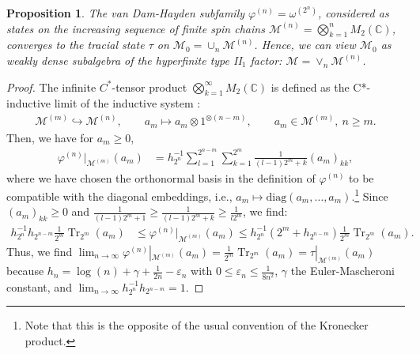 \documentclass[a4paper, 10pt, onecolumn, accepted=2025-07-22]{quantumarticle}
\newtheorem{proposition}[theorem]{Proposition}
\theoremstyle{definition}
\newcommand{\oo}{\infty}
\newcommand{\ox}{\otimes}
\newcommand{\mc}{\mathcal}
\newcommand{\eps}{\varepsilon}
\newcommand{\up}[1]{^{(#1)}}
\DeclareMathOperator{\tr}{Tr}
\def\CC{{\mathbb C}}
\def\M{{\mc M}}
\newcommand*{\1}{\text{\usefont{U}{bbold}{m}{n}1}}
\begin{document}
\begin{proposition}
\label{prop:vDHmbz}
    The van Dam-Hayden subfamily $\varphi^{(n)}=\omega\up{2^{n}}$, considered as states on the increasing sequence of finite spin chains $\M\up{n}=\bigotimes_{k=1}^{n}M_{2}(\CC)$, converges to the tracial state $\tau$ on $\M_0 = \cup_n \M\up{n}$.
    Hence, we can view $\M_0$ as weakly dense subalgebra of the hyperfinite type II$_1$ factor: $\M = \vee_{n}\M\up{n}$.
\end{proposition}

\begin{proof}
The infinite $C^*$-tensor product $\bigotimes_{k=1}^\oo M_2(\CC) $ is defined as the C*-inductive limit of the inductive system \cite[Sec.~11.4]{KadisonRingrose2}:
\begin{align}
    \M^{(m)}\hookrightarrow \M^{(n)},\qquad a_{m} \mapsto a_{m}\ox1^{\ox(n-m)},\qquad a_{m}\in\M^{(m)}, \ n\geq m.
\end{align}
Then, we have for $a_{m}\geq0$,
\begin{align}
    \varphi\up{n}|_{\M^{(m)}}(a_{m}) & = h_{2^{n}}^{-1}\sum_{l=1}^{2^{n-m}}\sum_{k=1}^{2^{m}}\tfrac{1}{(l-1)2^{m}+k}(a_{m})_{kk},
\end{align}
where we have chosen the orthonormal basis in the definition of $\varphi\up{n}$ to be compatible with the diagonal embeddings, i.e., $a_m\mapsto\mathrm{diag}(a_m,\ldots,a_m)$.\footnote{Note that this is the opposite of the usual convention of the Kronecker product.}
Since $(a_{m})_{kk}\geq0$ and $\tfrac{1}{(l-1)2^{m}+1}\geq\tfrac{1}{(l-1)2^{m}+k}\geq\tfrac{1}{l2^{m}}$, we find:
\begin{align}
    h_{2^{n}}^{-1}h_{2^{n-m}}\tfrac{1}{2^{m}}\tr_{2^{m}}(a_{m}) & \leq \varphi\up{n}|_{\M^{(m)}}(a_{m}) \leq h_{2^{n}}^{-1}(2^{m}+h_{2^{n-m}})\tfrac{1}{2^{m}}\tr_{2^{m}}(a_{m}).
\end{align}
Thus, we find $\lim_{n\rightarrow\infty}\varphi\up{n}|_{\M^{(m)}}(a_{m}) = \tfrac{1}{2^{m}}\tr_{2^{m}}(a_{m}) = \tau|_{\M^{(m)}}(a_{m})$ because $h_{n}=\log(n)+\gamma+\tfrac{1}{2n}-\eps_{n}$ with $0\leq\eps_{n}\leq\tfrac{1}{8n^{2}}$, $\gamma$ the Euler-Mascheroni constant, and $\lim_{n\rightarrow\infty}h_{2^{n}}^{-1}h_{2^{n-m}}=1$.
\end{proof}
\end{document}
